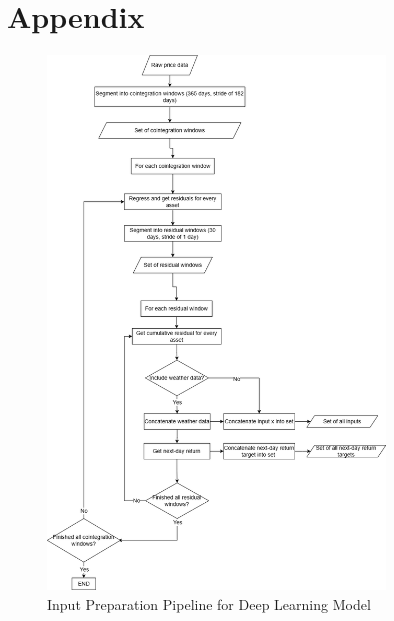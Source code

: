\documentclass[12pt]{article}
\begin{document}






\clearpage

\section{Appendix}
\begin{figure}[H]
    \centering
    \includegraphics[width=0.8\textwidth]{figures/input_preparation_pipeline.drawio.png}
    \caption{Input Preparation Pipeline for Deep Learning Model}
    \label{fig:input_preparation_pipeline}
\end{figure}
\end{document}

